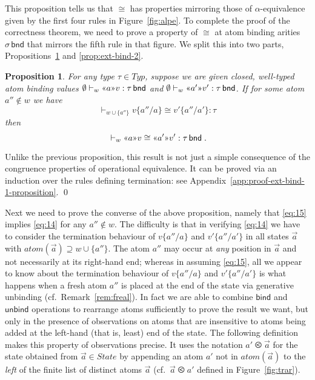 \documentclass{LMCS}
\theoremstyle{plain}
\newtheorem{proposition}[thm]{Proposition}
\theoremstyle{definition}
\newcommand{\ar}[1][\sigma]{#1}
\newcommand{\atm}[1][a]{#1}
\newcommand{\atoms}{\mathit{atom}}
\newcommand{\BIND}{\kw{bind}}
\newcommand{\BINDTY}{\kw{bnd}}
\newcommand{\BINDVAL}[2]{\mathopen{\text{\normalfont\guillemotleft}}#1
  \mathclose{\text{\normalfont\guillemotright}}#2}
\newcommand{\ent}{\vdash}
\newcommand{\LP}{\mathopen{\kw{(}}}
\newcommand{\kw}[1]{\mathsf{#1}}
\newcommand{\ofty}{:}
\newcommand{\opeq}{\cong}
\newcommand{\ords}{\olessthan}\newcommand{\PAIR}[2]{\LP#1\mathbin{\kw{,}}#2\RP}
\newcommand{\rename}[2]{\{#2/#1\}}
\newcommand{\RP}{\mathclose{\kw{)}}}
\newcommand{\State}{\mathit{State}}
\newcommand{\s}[1][a]{\vec{#1}}
\newcommand{\ty}{\tau}
\newcommand{\Ty}{\mathit{Typ}}
\newcommand{\UNBIND}{\kw{unbind}}
\newcommand{\val}[1][v]{#1}
\newcommand{\w}[1][w]{#1}
\begin{document}
This proposition tells us that $\opeq$ has properties mirroring those
of $\alpha$-equivalence given by the first four rules in
Figure~\ref{fig:alpe}. To complete the proof of the correctness
theorem, we need to prove a property of $\opeq$ at atom binding
arities $\ar\,\BINDTY$ that mirrors the fifth rule in that figure. We
split this into two parts, Propositions~\ref{prop:ext-bind-1} and
\ref{prop:ext-bind-2}.

\begin{proposition}
  \label{prop:ext-bind-1}
  For any type $\ty\in\Ty$, suppose we are given closed, well-typed
  atom binding values
  $\emptyset\ent_{\w}\BINDVAL{\atm}{\val}\ofty\ty\,\BINDTY$ and
  $\emptyset\ent_{\w}\BINDVAL{\atm'}{\val'}\ofty\ty\,\BINDTY$. If for
  some atom $\atm''\notin\w$ we have
  \begin{equation}
    \label{eq:14}
    {}\ent_{\w\cup\{\atm''\}}\val\rename{\atm}{\atm''} \opeq
    \val'\rename{\atm'}{\atm''} \ofty \ty
  \end{equation}
  then
  \begin{equation}
    \label{eq:15}
    {}\ent_{\w}\BINDVAL{\atm}{\val} \opeq \BINDVAL{\atm'}{\val'}
    \ofty\ty\,\BINDTY\;. 
  \end{equation}
\end{proposition}
\proof
  Unlike the previous proposition, this result is not just a simple
  consequence of the congruence properties of operational equivalence.
  It can be proved via an induction over the rules defining
  termination: see Appendix~\ref{app:proof-ext-bind-1-proposition}.
\qed

Next we need to prove the converse of the above proposition, namely
that \eqref{eq:15} implies \eqref{eq:14} for any $\atm''\notin\w$. The
difficulty is that in verifying \eqref{eq:14} we have to consider the
termination behaviour of $\val\rename{\atm}{\atm''}$ and
$\val'\rename{\atm'}{\atm''}$ in all states $\s$ with
$\atoms(\s)\supseteq\w\cup\{\atm''\}$. The atom $\atm''$ may occur at
\emph{any} position in $\s$ and not necessarily at its right-hand end;
whereas in assuming \eqref{eq:15}, all we appear to know about the
termination behaviour of $\val\rename{\atm}{\atm''}$ and
$\val'\rename{\atm'}{\atm''}$ is what happens when a fresh atom
$\atm''$ is placed at the end of the state via generative unbinding
(cf.~Remark~\ref{rem:freal}). In fact we are able to combine $\BIND$
and $\UNBIND$ operations to rearrange atoms sufficiently to prove the
result we want, but only in the presence of observations on atoms that
are insensitive to atoms being added at the left-hand (that is, least) end
of the state. The following definition makes this property of
observations precise. It uses the notation $\atm'\ords\s$ for the
state obtained from $\s\in\State$ by appending an atom $\atm'$ not in
$\atoms(\s)$ to the \emph{left} of the finite list of distinct atoms
$\s$ (cf.~$\s\ords\atm'$ defined in Figure~\ref{fig:trar}).
\end{document}
